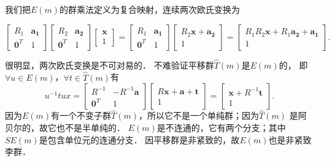我们把$E(m)$的群乘法定义为复合映射，连续两次欧氏变换为
\begin{small}
\setlength{\mathindent}{0em}
\begin{equation}\label{chlg:eqn_Emtimes}
    \begin{bmatrix}  R_1 & \boldsymbol{a_1} \\ \boldsymbol{0}^T & 1  \end{bmatrix}
    \begin{bmatrix}  R_2 & \boldsymbol{a_2} \\ \boldsymbol{0}^T & 1  \end{bmatrix}
    \begin{bmatrix}  \boldsymbol{x} \\ 1 \end{bmatrix} 
    =\begin{bmatrix}  R_1 & \boldsymbol{a_1} \\ \boldsymbol{0}^T & 1  \end{bmatrix}
    \begin{bmatrix}  R_2\boldsymbol{x} + \boldsymbol{a_2} \\  1  \end{bmatrix}
    =\begin{bmatrix}  R_1 R_2\boldsymbol{x} + R_1 \boldsymbol{a_2} +\boldsymbol{a_1} \\  1  \end{bmatrix}.
\end{equation}\setlength{\mathindent}{2em}
\end{small}
很明显，两次欧氏变换是不可对易的．
不难验证平移群$\hat{T}(m)$是$E(m)$的，
即$\forall u \in E(m)$，$\forall t \in \hat{T}(m)$有
\begin{equation}
    u^{-1} t u x= 
    \begin{bmatrix}  R^{-1} & -R^{-1} \boldsymbol{a} \\ \boldsymbol{0}^T & 1    \end{bmatrix}
    \begin{bmatrix}  R\boldsymbol{x} + \boldsymbol{a} +  \boldsymbol{t}\\  1  \end{bmatrix}
    =\begin{bmatrix} \boldsymbol{x} + R^{-1} \boldsymbol{t}\\  1  \end{bmatrix}.
\end{equation}
因为$E(m)$有一个不变子群$\hat{T}(m)$，所以它不是一个单纯群；因为$\hat{T}(m)$
是阿贝尔的，故它也不是半单纯的．
$E(m)$是不连通的，它有两个分支；其中$SE(m)$是包含单位元的连通分支．
因平移群是非紧致的，故$E(m)$也是非紧致李群．

